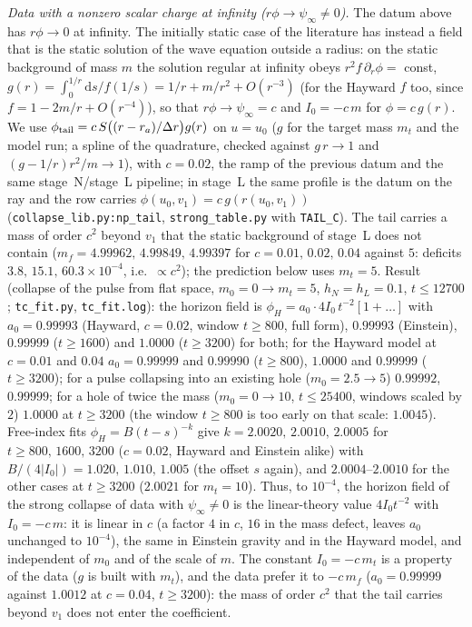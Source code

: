 \documentclass[11pt]{article}
\begin{document}
\emph{Data with a nonzero scalar charge at infinity ($r\phi\to\psi_\infty\neq0$).} The datum above has $r\phi\to0$ at infinity. The initially static case of the literature has instead a field that is the static solution of the wave equation outside a radius: on the static background of mass $m$ the solution regular at infinity obeys $r^{2}f\,\partial_r\phi=$ const, $g(r)=\int_0^{1/r}\mathrm ds/f(1/s)=1/r+m/r^{2}+O(r^{-3})$ (for the Hayward $f$ too, since $f=1-2m/r+O(r^{-4})$), so that $r\phi\to\psi_\infty=c$ and $I_0=-c\,m$ for $\phi=c\,g(r)$. We use $\phi_{\rm tail}=c\,S\bigl((r-r_a)/\Delta r\bigr)g(r)$ on $u=u_0$ ($g$ for the target mass $m_t$ and the model run; a spline of the quadrature, checked against $g\,r\to1$ and $(g-1/r)r^{2}/m\to1$), with $c=0.02$, the ramp of the previous datum and the same stage~N/stage~L pipeline; in stage~L the same profile is the datum on the ray and the row carries $\phi(u_0,v_1)=c\,g(r(u_0,v_1))$ (\texttt{collapse\_lib.py:np\_tail}, \texttt{strong\_table.py} with \texttt{TAIL\_C}). The tail carries a mass of order $c^{2}$ beyond $v_1$ that the static background of stage~L does not contain ($m_f=4.99962,\,4.99849,\,4.99397$ for $c=0.01,\,0.02,\,0.04$ against $5$: deficits $3.8,\,15.1,\,60.3\times10^{-4}$, i.e.\ $\propto c^{2}$); the prediction below uses $m_t=5$. Result (collapse of the pulse from flat space, $m_0=0\to m_t=5$, $h_N=h_L=0.1$, $t\le12700$; \texttt{tc\_fit.py}, \texttt{tc\_fit.log}): the horizon field is $\phi_H=a_0\cdot4I_0\,t^{-2}[1+\ldots]$ with $a_0=0.99993$ (Hayward, $c=0.02$, window $t\ge800$, full form), $0.99993$ (Einstein), $0.99999$ ($t\ge1600$) and $1.0000$ ($t\ge3200$) for both; for the Hayward model at $c=0.01$ and $0.04$ $a_0=0.99999$ and $0.99990$ ($t\ge800$), $1.0000$ and $0.99999$ ($t\ge3200$); for a pulse collapsing into an existing hole ($m_0=2.5\to5$) $0.99992$, $0.99999$; for a hole of twice the mass ($m_0=0\to10$, $t\le25400$, windows scaled by $2$) $1.0000$ at $t\ge3200$ (the window $t\ge800$ is too early on that scale: $1.0045$). Free-index fits $\phi_H=B(t-s)^{-k}$ give $k=2.0020,\,2.0010,\,2.0005$ for $t\ge800,\,1600,\,3200$ ($c=0.02$, Hayward and Einstein alike) with $B/(4|I_0|)=1.020,\,1.010,\,1.005$ (the offset $s$ again), and $2.0004$--$2.0010$ for the other cases at $t\ge3200$ ($2.0021$ for $m_t=10$). Thus, to $10^{-4}$, the horizon field of the strong collapse of data with $\psi_\infty\ne0$ is the linear-theory value $4I_0t^{-2}$ with $I_0=-c\,m$: it is linear in $c$ (a factor $4$ in $c$, $16$ in the mass defect, leaves $a_0$ unchanged to $10^{-4}$), the same in Einstein gravity and in the Hayward model, and independent of $m_0$ and of the scale of $m$. The constant $I_0=-c\,m_t$ is a property of the data ($g$ is built with $m_t$), and the data prefer it to $-c\,m_f$ ($a_0=0.99999$ against $1.0012$ at $c=0.04$, $t\ge3200$): the mass of order $c^{2}$ that the tail carries beyond $v_1$ does not enter the coefficient.
\end{document}
